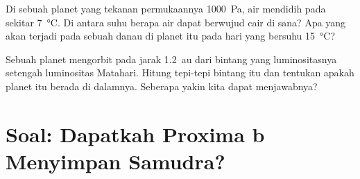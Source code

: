 \begin{exercise}[$\star\star\star$]\label{exo:g10:habitable-planet:14}
Di sebuah planet yang tekanan permukaannya \qty{1000}{Pa}, air mendidih pada
sekitar \qty{7}{\degreeCelsius}. Di antara suhu berapa air dapat berwujud cair
di sana? Apa yang akan terjadi pada sebuah danau di planet itu pada hari yang
bersuhu \qty{15}{\degreeCelsius}?
\end{exercise}

\begin{exercise}[$\star\star\star$]\label{exo:g10:habitable-planet:15}
Sebuah planet mengorbit pada jarak \qty{1.2}{au} dari bintang yang luminositasnya
setengah luminositas Matahari. Hitung tepi-tepi  bintang itu dan
tentukan apakah planet itu berada di dalamnya. Seberapa yakin kita dapat
menjawabnya?
\end{exercise}

\section{Soal: Dapatkah Proxima b Menyimpan Samudra?}

